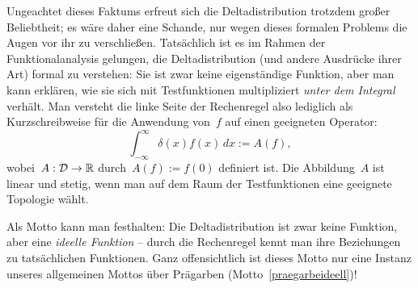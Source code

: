 Ungeachtet dieses Faktums erfreut sich die Deltadistribution trotzdem großer
Beliebtheit; es wäre daher eine Schande, nur wegen dieses formalen Problems die
Augen vor ihr zu verschließen. Tatsächlich ist es im Rahmen der
Funktionalanalysis gelungen, die Deltadistribution (und andere Ausdrücke ihrer
Art) formal zu verstehen: Sie ist zwar keine eigenständige Funktion, aber man
kann erklären, wie sie sich mit Testfunktionen multipliziert \emph{unter dem
Integral} verhält. Man versteht die linke Seite der Rechenregel also lediglich
als Kurzschreibweise für die Anwendung von~$f$ auf einen geeigneten Operator:
\[ \int_{-\infty}^\infty \delta(x) f(x) \,dx := A(f), \]
wobei~$A : \mathcal{D} \to \mathbb{R}$ durch~$A(f) := f(0)$ definiert ist. Die Abbildung~$A$
ist linear und stetig, wenn man auf dem Raum der Testfunktionen eine geeignete
Topologie wählt.

Als Motto kann man festhalten: Die Deltadistribution ist zwar keine Funktion,
aber eine \emph{ideelle Funktion} -- durch die Rechenregel kennt man ihre
Beziehungen zu tatsächlichen Funktionen. Ganz offensichtlich ist dieses Motto
nur eine Instanz unseres allgemeinen Mottos über Prägarben
(Motto~\ref{praegarbeideell})!





